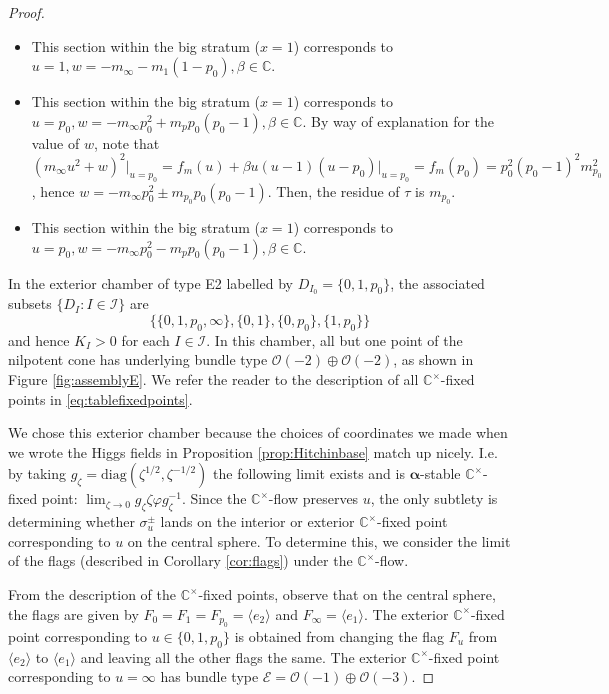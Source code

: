 \documentclass[12pt,letterpaper,reqno]{amsart}
\def\mathbf#1{#1}%
\theoremstyle{remark}
\theoremstyle{definition}
\numberwithin{thm}{section}
\numberwithin{equation}{section}
\numberwithin{figure}{section}
\newcommand{\cO}{\ensuremath{\mathcal O}}
\newcommand{\C}{\ensuremath{\mathbb C}}
\newcommand{\cE}{{\mathcal E}}
\begin{document}
\begin{proof}
\begin{itemize}
\item[$\sigma^-_1$ \quad ] This section within the big stratum  ($x=1$) corresponds to $u=1, w=-m_\infty - m_1(1-p_0), \beta \in \C$. 

\item[$\sigma^+_{p_0}$ \quad ] This section within the big stratum ($x=1$) corresponds to $u=p_0, w=-m_\infty p_0^2 + m_p p_0(p_0-1), \beta \in \C$. By way of explanation for the value of $w$, note that $(m_\infty u^2 + w)^2\Big|_{u=p_0}=f_{\mathbf{m}}(u) + \beta u(u-1)(u-p_0) \Big|_{u=p_0} = f_{\mathbf{m}}(p_0) = p_0^2(p_0-1)^2 m_{p_0}^2$, hence $w=-m_\infty p_0^2 \pm m_{p_0} p_0(p_0-1)$. Then, the residue of $\tau$ is $m_{p_0}$.

\item[$\sigma^-_{p_0}$ \quad ] This section within the big stratum ($x=1$) corresponds to $u=p_0, w=-m_\infty p_0^2 - m_p p_0(p_0-1), \beta \in \C$. 

\end{itemize}

In the exterior chamber of type E2 labelled by $D_{I_0}=\{0, 1, p_0\}$, 
the associated subsets $\{D_I: I \in \mathcal{I}\}$ are 
$$\{\{0, 1, p_0, \infty\}, \{0, 1\}, \{0, p_0\}, \{1, p_0\}\}$$
 and hence $K_I>0$ for each $I \in \mathcal{I}$. In this chamber, all but one point of the nilpotent cone has underlying bundle type $\cO(-2) \oplus \cO(-2)$, as shown in Figure \ref{fig:assemblyE}.
 We refer the reader to the description of all $\C^\times$-fixed points in \eqref{eq:tablefixedpoints}. 

We chose this exterior chamber because the choices of coordinates we made when we wrote the Higgs fields in Proposition \ref{prop:Hitchinbase} match up nicely. I.e. by taking $g_\zeta=\mathrm{diag}(\zeta^{1/2}, \zeta^{-1/2})$ the following limit exists and is $\boldsymbol{\alpha}$-stable $\C^\times$-fixed point: $\lim_{\zeta \to 0} g_\zeta \zeta\varphi g_{\zeta}^{-1}$.
Since the $\C^\times$-flow preserves $u$, the only subtlety is determining whether $\sigma^\pm_u$ lands on the interior or exterior $\C^\times$-fixed point corresponding to $u$ on the central sphere. To determine this, we consider the limit of the flags (described in Corollary \ref{cor:flags}) under the $\C^\times$-flow. 

From the description of the $\C^\times$-fixed points, observe that on the central sphere, the flags are given by $F_0=F_1=F_{p_0}= \langle e_2 \rangle$ and $F_\infty = \langle e_1 \rangle$. The exterior $\C^\times$-fixed point corresponding to $u \in \{0, 1, p_0\}$ is obtained from changing the flag $F_u$ from $\langle e_2 \rangle$ to $\langle e_1 \rangle$ and leaving all the other flags the same. The exterior $\C^\times$-fixed point corresponding to $u=\infty$ has bundle type $\cE=\cO(-1) \oplus \cO(-3)$. 


\end{proof}
\end{document}
